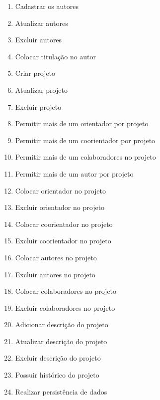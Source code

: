 \documentclass[
	article,			%
	11pt,				%
	oneside,			%
	a4paper,			%
	english,			%
	brazil,				%
	sumario=tradicional
	]{abntex2}
\begin{document}
\begin{enumerate}

    \item Cadastrar os autores
    \item Atualizar autores
    \item Excluir autores
    \item Colocar titulação no autor

    \item Criar projeto
    \item Atualizar projeto
    \item Excluir projeto
    
    \item Permitir mais de um orientador por projeto
    \item Permitir mais de um coorientador por projeto
    \item Permitir mais de um colaboradores no projeto
    \item Permitir mais de um autor por projeto
    
    \item Colocar orientador no projeto
    \item Excluir orientador no projeto

    \item Colocar coorientador no projeto
    \item Excluir coorientador no projeto

    \item Colocar autores no projeto
    \item Excluir autores no projeto

    \item Colocar colaboradores no projeto
    \item Excluir colaboradores no projeto

    \item Adicionar descrição do projeto
    \item Atualizar descrição do projeto
    \item Excluir descrição do projeto
    \item Possuir histórico do projeto

    \item Realizar persistência de dados

\end{enumerate}

% 
\end{document}
